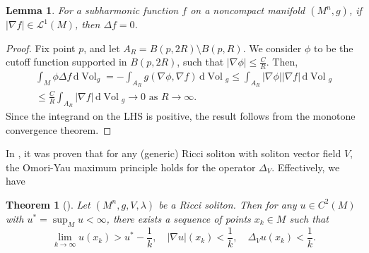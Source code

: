 \documentclass{amsart}
\newcommand{\abs}[1]{\left| #1 \right|}
\newcommand{\derivative}{\mathrm{d}}
\newcommand{\brackets}[1]{\left( #1 \right)}
\DeclareMathOperator*{\Vol}{Vol}
\theoremstyle{plain}
\theoremstyle{plain}
\theoremstyle{plain}
\newtheorem{theorem}{Theorem}
\theoremstyle{plain}
\newtheorem{lemma}{Lemma}
\theoremstyle{remark}
\begin{document}
\begin{lemma}\label{lem: Subharmonic with finite energy is harmonic}
    For a subharmonic function $f$ on a noncompact manifold $(M^n,g)$, if $\abs{\nabla f} \in \mathcal{L}^1 (M) $, then $\Delta f = 0$.
\end{lemma}
\begin{proof}
    Fix point $p$, and let $A_R = B(p,2R)\setminus B(p,R)$.  We consider 
   $\phi$ to be the cutoff function supported in $B(p,2R)$,  such that 
   $\abs{\nabla \phi}  \leq \frac{C}{R}$.  Then,
    \begin{multline*}
        \int_M \phi \Delta f \, \derivative {\Vol}_g
            = - \int_{A_R} g\brackets{\nabla \phi, \nabla f} \, \derivative {\Vol}{_g}
            \leq  \int_{A_R} \abs{\nabla \phi} \abs{\nabla f} \, \derivative {\Vol}{_g} \\
            \leq \frac{C}{R} \int_{A_R}  \abs{\nabla f} \, \derivative {\Vol}{_g} \to 0 \text{ as } R\to\infty.
    \end{multline*}
    Since the integrand on the LHS is positive, the result follows from the monotone convergence theorem.
    \end{proof}



In \cite{MR3546774}, it was proven that for any (generic) Ricci soliton with soliton vector field $V$, the Omori-Yau maximum principle holds for the operator $\Delta_V$.
Effectively, we have
\begin{theorem}[\cite{MR3546774}]\label{thm:Cheng Yau maximum principle}
Let $(M^n, g,V,\lambda)$ be a Ricci soliton.
Then for any $u\in C^{2}(M)$ with $u^*=\sup_{M}u<\infty$,  there exists a sequence of points $x_{k}\in M$ such that
\begin{equation*}
    \lim_{k\to \infty} u(x_k) > u^*-\frac{1}{k}, \quad \abs{\nabla u} (x_k) < \frac{1}{k}, \quad \Delta_V u (x_k) < \frac{1}{k}.
\end{equation*}
\end{theorem}


\vspace{0.1in}
\end{document}
